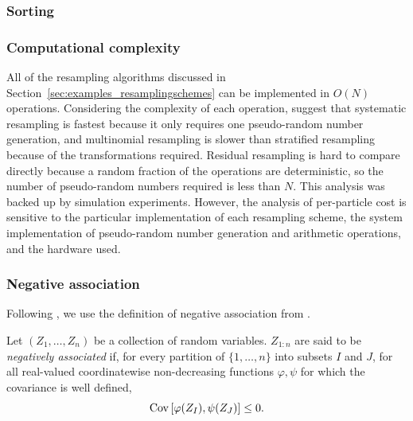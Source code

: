 \subsubsection{Sorting}



\subsubsection{Computational complexity \seb{$\checkmark$} }
All of the resampling algorithms discussed in Section~\ref{sec:examples_resamplingschemes} can be implemented in $O(N)$ operations.
Considering the complexity of each operation, \textcite{hol2004,hol2006} suggest that systematic resampling is fastest because it only requires one pseudo-random number generation, and multinomial resampling is slower than stratified resampling because of the transformations required. Residual resampling is hard to compare directly because a random fraction of the operations are deterministic, so the number of pseudo-random numbers required is less than $N$.
This analysis was backed up by simulation experiments.
However, the analysis of per-particle cost is sensitive to the particular implementation of each resampling scheme, the system implementation of pseudo-random number generation and arithmetic operations, and the hardware used.




\subsubsection{Negative association}

Following \textcite{gerber2017}, we use the definition of negative association from \textcite{joag1983}.
\begin{defn}
Let $(Z_1, \dots, Z_n)$ be a collection of random variables. 
$Z_{1:n}$ are said to be \emph{negatively associated} if, for every partition of $\{1,\dots, n\}$ into subsets $I$ and $J$, for all real-valued coordinatewise non-decreasing functions $\varphi, \psi$ for which the covariance is well defined,
\begin{equation*}
\operatorname{Cov} \left[ \varphi( Z_I) , \psi(Z_J) \right] \leq 0 .
\end{equation*}
\end{defn}



